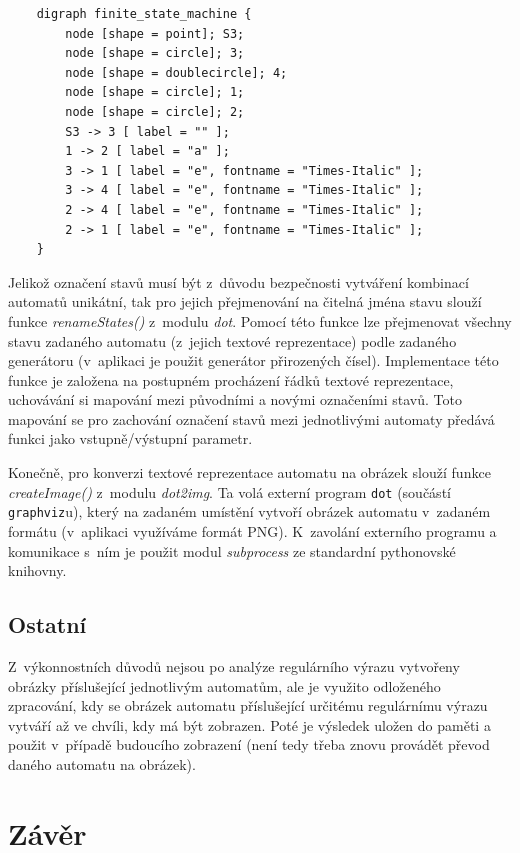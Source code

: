 \documentclass[10pt, notitlepage]{article}
\begin{document}
\begin{verbatim}
    digraph finite_state_machine {
        node [shape = point]; S3;
        node [shape = circle]; 3;
        node [shape = doublecircle]; 4;
        node [shape = circle]; 1;
        node [shape = circle]; 2;
        S3 -> 3 [ label = "" ];
        1 -> 2 [ label = "a" ];
        3 -> 1 [ label = "e", fontname = "Times-Italic" ];
        3 -> 4 [ label = "e", fontname = "Times-Italic" ];
        2 -> 4 [ label = "e", fontname = "Times-Italic" ];
        2 -> 1 [ label = "e", fontname = "Times-Italic" ];
    }
\end{verbatim}

Jelikož označení stavů musí být z~důvodu bezpečnosti vytváření kombinací
automatů unikátní, tak pro jejich přejmenování na čitelná jména stavu slouží
funkce \emph{renameStates()} z~modulu \emph{dot}. Pomocí této funkce lze
přejmenovat všechny stavu zadaného automatu (z~jejich textové reprezentace)
podle zadaného generátoru (v~aplikaci je použit generátor přirozených čísel).
Implementace této funkce je založena na postupném procházení řádků textové
reprezentace, uchovávání si mapování mezi původními a novými označeními stavů.
Toto mapování se pro zachování označení stavů mezi jednotlivými automaty
předává funkci jako vstupně/výstupní parametr.

Konečně, pro konverzi textové reprezentace automatu na obrázek slouží funkce
\emph{createImage()} z~modulu \emph{dot2img}. Ta volá externí program
\texttt{dot} (součástí \texttt{graphviz}u), který na zadaném umístění vytvoří
obrázek automatu v~zadaném formátu (v~aplikaci využíváme formát PNG).
K~zavolání externího programu a komunikace s~ním je použit modul
\emph{subprocess} ze standardní pythonovské knihovny.

\subsection{Ostatní}
\label{sec:ImplOthers}

Z~výkonnostních důvodů nejsou po analýze regulárního výrazu vytvořeny obrázky
příslušející jednotlivým automatům, ale je využito odloženého zpracování, kdy
se obrázek automatu příslušející určitému regulárnímu výrazu vytváří až ve
chvíli, kdy má být zobrazen. Poté je výsledek uložen do paměti a použit
v~případě budoucího zobrazení (není tedy třeba znovu provádět převod daného
automatu na obrázek).

\section{Závěr}
\label{sec:Conclusion}
\end{document}
